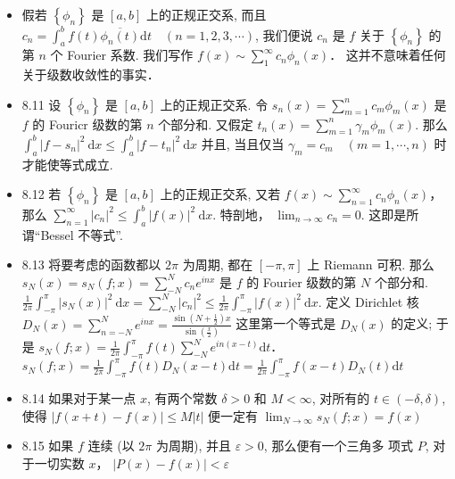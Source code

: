 \begin{itemize}
\item 假若 $\left\{\phi_{n}\right\}$ 是 $[a, b]$ 上的正规正交系, 而且 $c_{n}=\int_{a}^{b} f(t) \overline{\phi_{n}(t)} \mathrm{d} t \quad(n=1,2,3, \cdots)$, 我们便说 $c_{n}$ 是 $f$ 关于 $\left\{\phi_{n}\right\}$ 的第 $n$ 个 Fourier 系数. 我们写作 $f(x) \sim \sum_{1}^{\infty} c_{n} \phi_{n}(x)$． 这并不意味着任何关于级数收敛性的事实．

\item 8.11 设 $\left\{\phi_{n}\right\}$ 是 $[a, b]$ 上的正规正交系. 令 $s_{n}(x)=\sum_{m=1}^{n} c_{m} \phi_{m}(x)$ 是 $f$ 的 Fouricr 级数的第 $n$ 个部分和. 又假定 $t_{n}(x)=\sum_{m=1}^{n} \gamma_{m} \phi_{m}(x) .$ 那么 $\int_{a}^{b}\left|f-s_{n}\right|^{2} \mathrm{~d} x \leqslant \int_{a}^{b}\left|f-t_{n}\right|^{2} \mathrm{~d} x$ 并且, 当且仅当 $\gamma_{m}=c_{m} \quad(m=1, \cdots, n)$ 时才能使等式成立.

\item 8.12 若 $\left\{\phi_{n}\right\}$ 是 $[a, b]$ 上的正规正交系, 又若 $f(x) \sim \sum_{n=1}^{\infty} c_{n} \phi_{n}(x)$， 那么 $\sum_{n=1}^{\infty}\left|c_{n}\right|^{2} \leqslant \int_{a}^{b}|f(x)|^{2} \mathrm{~d} x$. 特剖地， $\lim _{n \rightarrow \infty} c_{n}=0$. 这即是所谓“Bessel 不等式”.

\item 8.13 将要考虑的函数都以 $2 \pi$ 为周期, 都在 $[-\pi, \pi]$ 上 Riemann 可积. 那么 $s_{N}(x)=s_{N}(f ; x)=\sum_{-N}^{N} c_{n} e^{i n x}$ 是 $f$ 的 Fourier 级数的第 $N$ 个部分和. $\frac{1}{2 \pi} \int_{-\pi}^{\pi}\left|s_{N}(x)\right|^{2} \mathrm{~d} x=\sum_{-N}^{N}\left|c_{n}\right|^{2} \leqslant \frac{1}{2 \pi} \int_{-\pi}^{\pi}|f(x)|^{2} \mathrm{~d} x$. 定义 Dirichlet 核 $D_{N}(x)=\sum_{n=-N}^{N} e^{i n x}=\frac{\sin \left(N+\frac{1}{2}\right) x}{\sin \left(\frac{x}{2}\right)}$ 这里第一个等式是 $D_{N}(x)$ 的定义; 于是 $s_{N}(f ; x) =\frac{1}{2 \pi} \int_{-\pi}^{\pi} f(t) \sum_{-N}^{N} e^{i n(x-t)} \mathrm{d} t$． $s_{N}(f ; x)= \frac{1}{2 \pi} \int_{-\pi}^{\pi} f(t) D_{N}(x-t) \mathrm{d} t =\frac{1}{2 \pi} \int_{-\pi}^{\pi} f(x-t) D_{N}(t) \mathrm{d} t$

\item 8.14 如果对于某一点 $x$, 有两个常数 $\delta>0$ 和 $M<\infty$, 对所有的 $t \in(-\delta, \delta)$, 使得 $|f(x+t)-f(x)| \leqslant M|t|$ 便一定有 $\lim _{N \rightarrow \infty} s_{N}(f ; x)=f(x)$

\item 8.15 如果 $f$ 连续 (以 $2 \pi$ 为周期), 并且 $\varepsilon>0$, 那么便有一个三角多 项式 $P$, 对于一切实数 $x$， $|P(x)-f(x)|<\varepsilon$


\end{itemize}
